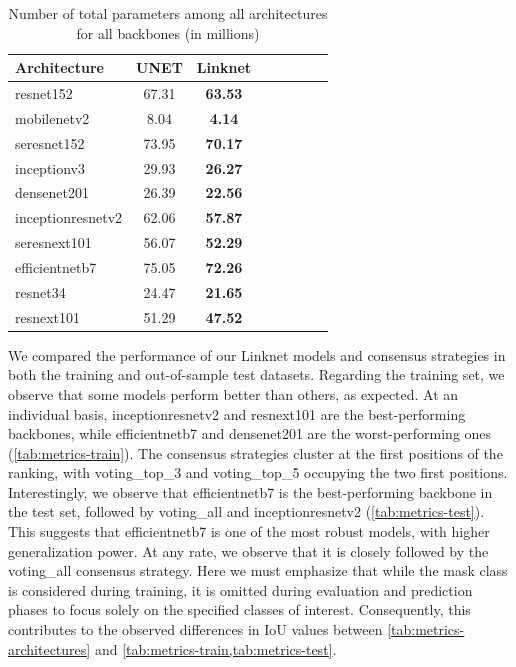 \begin{table}[H]
    \centering
    \caption{Number of total parameters among all architectures for all
        backbones (in millions)}
    \label{tab:parameters-architectures}
    \begin{tabular}{lccccccc}
        \toprule
        \textbf{Architecture} & \textbf{UNET} & \textbf{Linknet} \\
        \midrule
        resnet152             & 67.31         & \textbf{63.53}   \\
        mobilenetv2           & 8.04          & \textbf{4.14}    \\
        seresnet152           & 73.95         & \textbf{70.17}   \\
        inceptionv3           & 29.93         & \textbf{26.27}   \\
        densenet201           & 26.39         & \textbf{22.56}   \\
        inceptionresnetv2     & 62.06         & \textbf{57.87}   \\
        seresnext101          & 56.07         & \textbf{52.29}   \\
        efficientnetb7        & 75.05         & \textbf{72.26}   \\
        resnet34              & 24.47         & \textbf{21.65}   \\
        resnext101            & 51.29         & \textbf{47.52}   \\
        \bottomrule
    \end{tabular}
\end{table}

We compared the performance of our Linknet models and consensus strategies
in both the training and out-of-sample test datasets. Regarding the training
set, we observe that some models perform better than others, as expected. At an
individual basis, inceptionresnetv2 and resnext101 are the best-performing
backbones, while efficientnetb7 and densenet201 are the worst-performing ones
(\cref{tab:metrics-train}). The consensus strategies cluster at the first
positions of the ranking, with voting\_top\_3 and voting\_top\_5 occupying the
two first positions. Interestingly, we observe that efficientnetb7 is the
best-performing backbone in the test set, followed by voting\_all and
inceptionresnetv2 (\cref{tab:metrics-test}). This suggests that efficientnetb7
is one of the most robust models, with higher generalization power. At any
rate, we observe that it is closely followed by the voting\_all consensus
strategy. Here we must emphasize that while the mask class is considered during
training, it is omitted during evaluation and prediction phases to focus solely
on the specified classes of interest. Consequently, this contributes to the
observed differences in IoU values between \cref{tab:metrics-architectures} and
\cref{tab:metrics-train,tab:metrics-test}.

